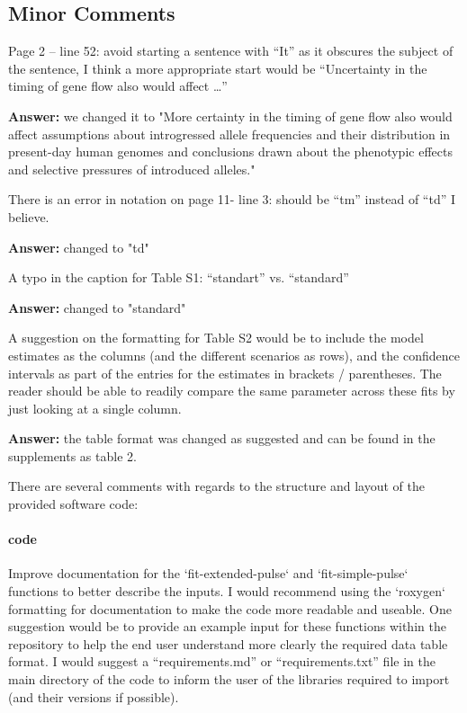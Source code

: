 \documentclass[11pt]{article}
\let\oldparagraph\paragraph
\renewcommand{\paragraph}[1]{\oldparagraph{#1}\mbox{}}
\begin{document}
\subsection{Minor Comments}\label{Minor Comments}

Page 2 – line 52: avoid starting a sentence with “It” as it obscures the subject of the sentence, I think a more appropriate start would be “Uncertainty in the timing of gene flow also would affect …”

\textbf{Answer:} we changed it to "More certainty in the timing of gene flow also would affect  assumptions about introgressed allele frequencies and their distribution in present-day human genomes and conclusions drawn about the phenotypic effects and selective pressures of introduced alleles."

There is an error in notation on page 11- line 3: should be “tm” instead of “td” I believe.

\textbf{Answer:} changed to "td"

A typo in the caption for Table S1: “standart” vs. “standard”

\textbf{Answer:} changed to "standard"

A suggestion on the formatting for Table S2 would be to include the model estimates as the columns (and the different scenarios as rows), and the confidence intervals as part of the entries for the estimates in brackets / parentheses. The reader should be able to readily compare the same parameter across these fits by just looking at a single column. 

\textbf{Answer:} the table format was changed as suggested and can be found in the supplements as table 2.

There are several comments with regards to the structure and layout of the provided software code:


\paragraph{code}
Improve documentation for the `fit-extended-pulse` and `fit-simple-pulse` functions to better describe the inputs. I would recommend using the `roxygen` formatting for documentation to make the code more readable and useable. 
One suggestion would be to provide an example input for these functions within the repository to help the end user understand more clearly the required data table format. 
I would suggest a “requirements.md” or “requirements.txt” file in the main directory of the code to inform the user of the libraries required to import (and their versions if possible).
\end{document}
